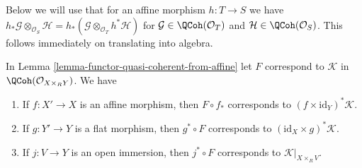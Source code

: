 \begin{remark}
\label{remark-affine-morphism}
Below we will use that for an affine morphism
$h : T \to S$ we have $h_*\mathcal{G} \otimes_{\mathcal{O}_S} \mathcal{H} =
h_*(\mathcal{G} \otimes_{\mathcal{O}_T} h^*\mathcal{H})$ for
$\mathcal{G} \in \QCoh(\mathcal{O}_T)$ and
$\mathcal{H} \in \QCoh(\mathcal{O}_S)$. This follows
immediately on translating into algebra.
\end{remark}

\begin{lemma}
\label{lemma-functor-quasi-coherent-from-affine-compose}
In Lemma \ref{lemma-functor-quasi-coherent-from-affine} let $F$
correspond to $\mathcal{K}$ in $\QCoh(\mathcal{O}_{X \times_R Y})$.
We have
\begin{enumerate}
\item If $f : X' \to X$ is an affine morphism, then $F \circ f_*$
corresponds to $(f \times \text{id}_Y)^*\mathcal{K}$.
\item If $g : Y' \to Y$ is a flat morphism, then $g^* \circ F$ corresponds to
$(\text{id}_X \times g)^*\mathcal{K}$.
\item If $j : V \to Y$ is an open immersion, then $j^* \circ F$
corresponds to $\mathcal{K}|_{X \times_R V}$.
\end{enumerate}
\end{lemma}


